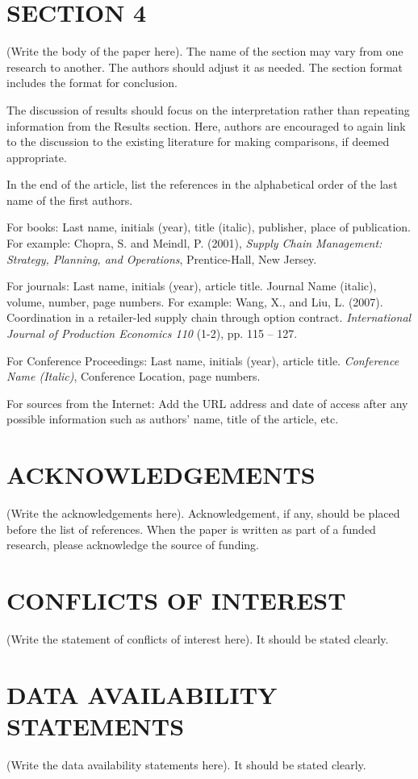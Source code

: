 \documentclass[preprint]{oscmjournal}
\begin{document}
\section{SECTION 4}\label{sec:section_4}
(Write the body of the paper here). The name of the section may vary from one research to another. The authors should adjust it as needed. The section format includes the format for conclusion.

The discussion of results should focus on the interpretation rather than repeating information from the Results section. Here, authors are encouraged to again link to the discussion to the existing literature for making comparisons, if deemed appropriate.

In the end of the article, list the references in the alphabetical order of the last name of the first authors. 

For books: Last name, initials (year), title (italic), publisher, place of publication. For example: Chopra, S. and Meindl, P. (2001), \textit{Supply Chain Management: Strategy, Planning, and Operations}, Prentice-Hall, New Jersey. 

For journals: Last name, initials (year), article title. Journal Name (italic), volume, number, page numbers. For example: Wang, X., and Liu, L. (2007). Coordination in a retailer-led supply chain through option contract. \textit{International Journal of Production Economics 110} (1-2), pp. 115 – 127. 

For Conference Proceedings: Last name, initials (year), article title. \textit{Conference Name (Italic)}, Conference Location, page numbers. 

For sources from the Internet: Add the URL address and date of access after any possible information such as authors’ name, title of the article, etc.


\section*{ACKNOWLEDGEMENTS}
(Write the acknowledgements here). Acknowledgement, if any, should be placed before the list of references. When the paper is written as part of a funded research, please acknowledge the source of funding. 

\section*{CONFLICTS OF INTEREST}
(Write the statement of conflicts of interest here). It should be stated clearly.

\section*{DATA AVAILABILITY STATEMENTS}
(Write the data availability statements here). It should be stated clearly.

\printbibliography[title={REFERENCES}]
\end{document}
